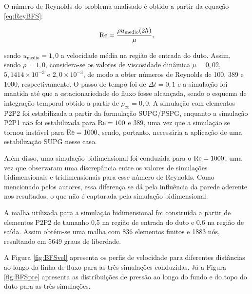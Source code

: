 O número de Reynolds do problema analisado é obtido a partir da equação \eqref{eq:ReyBFS}:

\begin{equation}
    \mathrm{Re}=\frac{\rho u_\mathrm{medio}(2h)}{\mu}\text{,}
    \label{eq:ReyBFS}
\end{equation}

\noindent sendo $u_\mathrm{medio}=1,0$ a velocidade média na região de entrada do duto. Assim, sendo $\rho=1,0$, considera-se os valores de viscosidade dinâmica $\mu=0,02$, $5,1414\times10^{-3}$ e $2,0\times10^{-3}$, de modo a obter números de Reynolds de 100, 389 e 1000, respectivamente. O passo de tempo foi de $\Delta t=0,1$ e a simulação foi mantida até que a estacionariedade do fluxo fosse alcançada, sendo o esquema de integração temporal obtido a partir de $\rho_\infty=0,0$. A simulação com elementos P2P2 foi estabilizada a partir da formulação SUPG/PSPG, enquanto a simulação P2P1 não foi estabilizada para $\mathrm{Re}=100$ e $389$, uma vez que a simulação se tornou instável para $\mathrm{Re}=1000$, sendo, portanto, necessária a aplicação de uma estabilização SUPG nesse caso.

Além disso, uma simulação bidimensional foi conduzida para o $\mathrm{Re}=1000$, uma vez que  observaram uma discrepância entre os valores de simulações bidimensionais e tridimensionais para esse número de Reynolds. Como mencionado pelos autores, essa diferença se dá pela influência da parede aderente nos resultados, o que não é capturada pela simulação bidimensional.

A malha utilizada para a simulação bidimensional foi construída a partir de elementos P2P2 de tamanho 0,5 na região de entrada do duto e 0,6 na região de saída. Assim obtém-se uma malha com 836 elementos finitos e 1883 nós, resultando em 5649 graus de liberdade.

A Figura \ref{fig:BFSvel} apresenta os perfis de velocidade para diferentes distâncias ao longo da linha de fluxo para as três simulações conduzidas. Já a Figura \ref{fig:BFSpre} apresenta as distribuições de pressão ao longo do fundo e do topo do duto para as três simulações.

